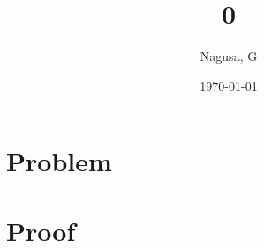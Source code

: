 \documentclass[11pt, a4paper]{article}
\title{0}
\author{Nagusa, G}
\date{\today}
\begin{document}
\maketitle

\section*{Problem}



\section*{Proof}
\end{document}

